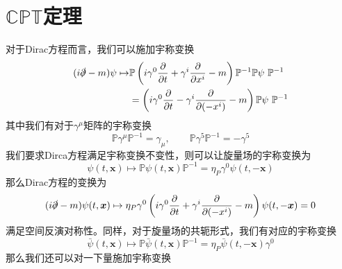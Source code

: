 \section{$\mathbb{CPT}$定理}
对于Dirac方程而言，我们可以施加宇称变换
\begin{equation}
\begin{split}
        (i\slashed{\partial}-m)\psi \mapsto &\mathbb{P}\left(i\gamma^0\frac{\partial}{\partial t} +\gamma^i \frac{\partial}{\partial x^i}-m\right)\mathbb{P}^{-1}\mathbb{P}\psi~\mathbb{P}^{-1} \\&= \left(i\gamma^0\frac{\partial}{\partial t} -\gamma^i \frac{\partial}{\partial (-x^i)}-m\right)\mathbb{P}\psi~\mathbb{P}^{-1}
\end{split}
\end{equation}
其中我们有对于$\gamma^\mu$矩阵的宇称变换
\begin{equation}
\mathbb{P}\gamma^\mu\mathbb{P}^{-1}=\gamma_\mu,\qquad\mathbb{P}\gamma^5\mathbb{P}^{-1}=-\gamma^5
\end{equation}
我们要求Dirca方程满足宇称变换不变性，则可以让旋量场的宇称变换为
\begin{equation}
   \psi(t,\boldsymbol{x})\mapsto \mathbb{P}\psi(t,\boldsymbol{x})\mathbb{P}^{-1} = \eta_P\gamma^0\psi(t,-\boldsymbol{x})
\end{equation}
那么Dirac方程的变换为
\begin{equation}
    \begin{split}
      (i\slashed{\partial}-m)\psi(t,\boldsymbol{x}) \mapsto \eta_P\gamma^0\left(i\gamma^0\frac{\partial}{\partial t} +\gamma^i \frac{\partial}{\partial (-x^i)}-m\right)\psi(t,-\boldsymbol{x}) = 0
    \end{split}
\end{equation}
满足空间反演对称性。同样，对于旋量场的共轭形式，我们有对应的宇称变换
\begin{equation}
    \bar{\psi}(t,\boldsymbol{x})\mapsto \mathbb{P}\bar{\psi}(t,\boldsymbol{x})\mathbb{P}^{-1} = \eta_P\bar{\psi}(t,-\boldsymbol{x})\gamma^0
\end{equation}
那么我们还可以对一下量施加宇称变换
